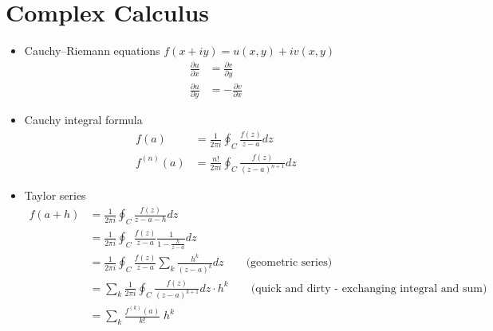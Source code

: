 \documentclass[../main.tex]{subfiles}
\begin{document}
\section{Complex Calculus}
\begin{itemize}
\item Cauchy–Riemann equations $f(x+iy)=u(x,y)+iv(x,y)$
\begin{align}
\frac{\partial u}{\partial x}&=\frac{\partial v}{\partial y}\\
\frac{\partial u}{\partial y}&=-\frac{\partial v}{\partial x}
\end{align}
\item Cauchy integral formula
\begin{align}
f(a)&=\frac{1}{2\pi i}\oint_C\frac{f(z)}{z-a}dz\\
f^{(n)}(a)&=\frac{n!}{2\pi i}\oint_C\frac{f(z)}{(z-a)^{n+1}}dz
\end{align}
\item Taylor series
\begin{align}
f(a+h)
&=\frac{1}{2\pi i}\oint_C\frac{f(z)}{z-a-h}dz\\
&=\frac{1}{2\pi i}\oint_C\frac{f(z)}{z-a}\frac{1}{1-\frac{h}{z-a}}dz\\
&=\frac{1}{2\pi i}\oint_C\frac{f(z)}{z-a}\sum_k\frac{h^k}{(z-a)^k}dz\qquad\text{(geometric series)}\\
&=\sum_k \frac{1}{2\pi i}\oint_C\frac{f(z)}{(z-a)^{k+1}}dz\cdot h^k\qquad\text{(quick and dirty - exchanging integral and sum)}\\
&=\sum_k \frac{f^{(k)}(a)}{k!}\; h^k
\end{align}

\end{itemize}
\end{document}
